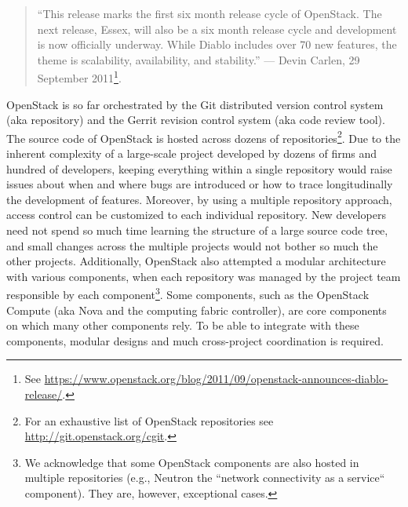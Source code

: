 \begin{quotation}
\footnotesize
``This release marks the first six month release cycle of OpenStack.  The next release, Essex, will also be a six month release cycle and development is now officially underway. While Diablo includes over 70 new features, the theme is scalability, availability, and stability.''  --- Devin Carlen, 29 September 2011\footnote{See \url{https://www.openstack.org/blog/2011/09/openstack-announces-diablo-release/}.}.
\end{quotation}



OpenStack is so far orchestrated by the Git distributed version control system (aka repository) and the Gerrit revision control system (aka code review tool). 
The source code of OpenStack is hosted across dozens of repositories\footnote{For an exhaustive list of OpenStack repositories see \url{http://git.openstack.org/cgit}.}. Due to the inherent complexity of a large-scale project developed by dozens of firms and hundred of developers,  keeping everything within a single repository would raise issues about when and where bugs are introduced  or how to trace longitudinally the development of features. Moreover, by using a  multiple repository approach, access control can be customized to each individual repository. New developers need not spend so much time learning the structure of a large source code tree, and small changes across the multiple projects would not bother so much the other projects. Additionally,  OpenStack also attempted a modular architecture with various components, when each repository was managed by the project team responsible by each component\footnote{We acknowledge that some OpenStack components are also hosted in multiple repositories (e.g., Neutron the  “network connectivity as a service`` component). They are, however, exceptional cases.}. Some components, such as the OpenStack Compute (aka Nova and the computing fabric controller), are core components on which many other components rely. To be able to integrate with these components, modular designs and much cross-project coordination is required.


